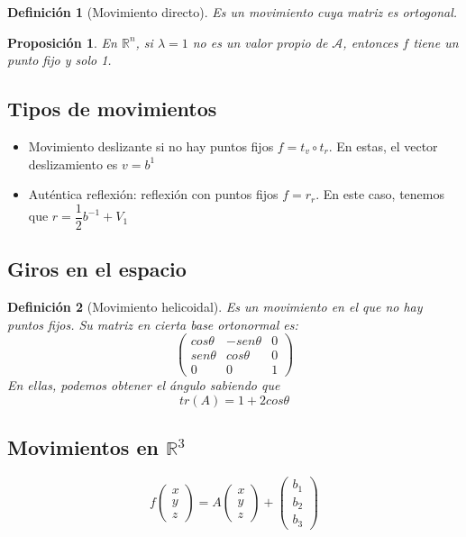 \documentclass[11pt, a4paper, titlepage]{article}
\newcommand{\R}{\mathbb{R}}
\theoremstyle{theorem-style}
\newtheorem{nprop}{Proposición}[section]
\theoremstyle{definition-style}
\newtheorem{ndef}{Definición}[section]
\theoremstyle{remark-style}
\theoremstyle{example-style}
\begin{document}
\begin{ndef}[Movimiento directo]
  Es un movimiento cuya matriz es ortogonal. 
\end{ndef}
\begin{nprop}
  En $\R^n$, si $\lambda = 1$ no es un valor propio de $\mathcal A$, entonces $f$ tiene un punto fijo y solo 1.
\end{nprop}

\subsection{Tipos de movimientos}
\begin{itemize}
\item Movimiento deslizante si no hay puntos fijos $f = t_v \circ t_r$. En estas, el vector deslizamiento es $v=b^1$
\item Auténtica reflexión: reflexión con puntos fijos $f=r_r$. En este caso, tenemos que $r= \dfrac{1}{2}b^{-1}+V_1$
\end{itemize}

\subsection{Giros en el espacio}
\begin{ndef}[Movimiento helicoidal]
  Es un movimiento en el que no hay puntos fijos. Su matriz en cierta base ortonormal es:
  \[
    \begin{pmatrix}
      cos \theta & -sen\theta & 0 \\
      sen \theta & cos\theta & 0\\
      0 & 0 & 1
    \end{pmatrix} 
  \]
  En ellas, podemos obtener el ángulo sabiendo que 
  \[
    tr(A) = 1+2cos\theta
  \]
\end{ndef}



\subsection{Movimientos en $\R^3$}

\[
  f \begin{pmatrix}
    x\\
    y\\
    z
  \end{pmatrix} = A\begin{pmatrix}
    x\\
    y\\
    z
  \end{pmatrix} + \begin{pmatrix}
    b_1\\
    b_2\\
    b_3
  \end{pmatrix}
\]
\end{document}
